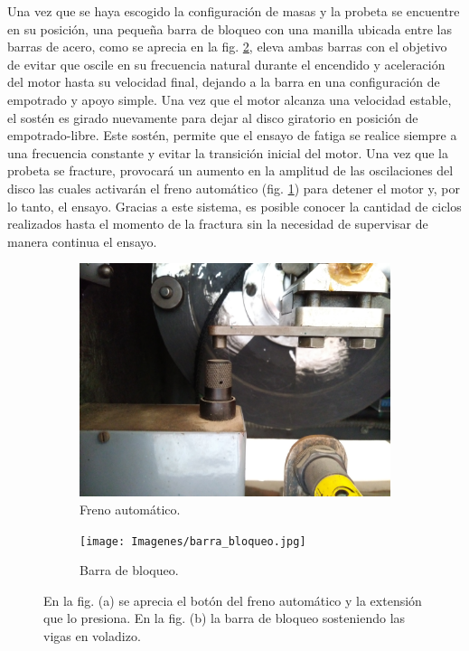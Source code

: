 Una vez que se haya escogido la configuración de masas y la probeta se encuentre en su posición, una pequeña barra de bloqueo con una manilla ubicada entre las barras de acero, como se aprecia en la fig. \ref{fig:barra_bloqueo}, eleva ambas barras con el objetivo de evitar que oscile en su frecuencia natural durante el encendido y aceleración del motor hasta su velocidad final, dejando a la barra en una configuración de empotrado y apoyo simple. Una vez que el motor alcanza una velocidad estable, el sostén es girado nuevamente para dejar al disco giratorio en posición de empotrado-libre. Este sostén, permite que el ensayo de fatiga se realice siempre a una frecuencia constante y evitar la transición inicial del motor. Una vez que la probeta se fracture, provocará un aumento en la amplitud de las oscilaciones del disco las cuales activarán el freno automático (fig. \ref{fig:freno_auto}) para detener el motor y, por lo tanto, el ensayo. Gracias a este sistema, es posible conocer la cantidad de ciclos realizados hasta el momento de la fractura sin la necesidad de supervisar de manera continua el ensayo.

\begin{figure}[h]
\centering
	\begin{subfigure}{0.55\linewidth}
		\centering
		\includegraphics[width=\linewidth]{Imagenes/freno_automatico.jpg}
		\caption{Freno automático.}\label{fig:freno_auto}
	\end{subfigure}
	\begin{subfigure}{0.365\linewidth}
		\centering
		\texttt{[image: Imagenes/barra\_bloqueo.jpg]}
		\caption{Barra de bloqueo.}\label{fig:barra_bloqueo}
	\end{subfigure}%
\caption{En la fig. (a) se aprecia el botón del freno automático y la extensión que lo presiona. En la fig. (b) la barra de bloqueo sosteniendo las vigas en voladizo.}
\label{fig:barra_freno}
\end{figure}

